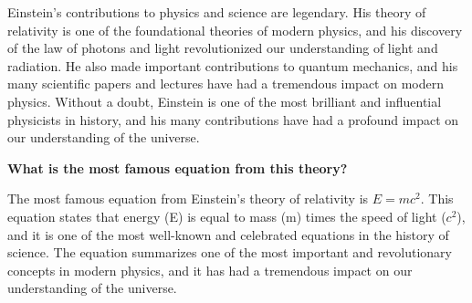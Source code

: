 \documentclass[11pt]{article}
\begin{document}
\begin{framed}
\begin{minipage}{.9\textwidth}
Einstein’s contributions to physics and science are legendary.  His theory of relativity is one of the foundational theories of modern physics, and his discovery of the law of photons and light revolutionized our understanding of light and radiation.  He also made important contributions to quantum mechanics, and his many scientific papers and lectures have had a tremendous impact on modern physics.  Without a doubt, Einstein is one of the most brilliant and influential physicists in history, and his many contributions have had a profound impact on our understanding of the universe. 

\vspace{1em}

\textbf{What is the most famous equation from this theory?}

\vspace{1em}

The most famous equation from Einstein’s theory of relativity is $E = mc^2$.  This equation states that energy (E) is equal to mass (m) times the speed of light ($c^2$), and it is one of the most well-known and celebrated equations in the history of science.  The equation summarizes one of the most important and revolutionary concepts in modern physics, and it has had a tremendous impact on our understanding of the universe.

\end{minipage}
\vspace{.5em}
\end{framed}
\end{document}
